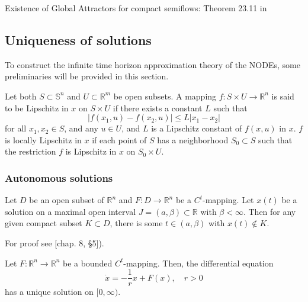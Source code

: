 \documentclass{article}
\newcounter{ct}
\begin{document}
 Existence of Global Attractors for compact semiflows: Theorem 23.11 in  \citep{sell2013dynamics}
 


\subsection{Uniqueness of solutions}\label{sec:solutions}
To construct the infinite time horizon approximation theory of the NODEs, some preliminaries will be provided in this section.


\begin{definition}[Lipschitz]
 Let both $S \subset \mathbb{S}^n$ and $U \subset \mathbb{R}^m$ be open subsets.
 A mapping $f: S \times U \rightarrow \mathbb{R}^n$ is said to be Lipschitz in $x$ on $S \times U$ if there exists a constant $L$ such that
\[
|f(x_1, u) - f(x_2, u)| \leq L |x_1 - x_2|
\]
for all $x_1, x_2 \in S$, and any $u \in U$, and $L$ is a Lipschitz constant of $f(x, u)$ in $x$. $f$ is locally Lipschitz in $x$ if each point of $S$ has a neighborhood $S_0 \subset S$ such that the restriction $f$ is Lipschitz in $x$ on $S_0 \times U$.
\end{definition}




\subsubsection{Autonomous solutions}\label{sec:autonomousunique}
\begin{lemma}
Let \( D \) be an open subset of \( \mathbb{R}^n \) and \( F : D \to \mathbb{R}^n \) be a \( C^t \)-mapping. 
Let \( x(t) \) be a solution on a maximal open interval \( J = (a, \beta) \subset \mathbb{R} \) with \( \beta < \infty \). 
Then for any given compact subset \( K \subset D \), there is some \( t \in (a, \beta) \) with \( x(t) \notin K \). 
\end{lemma}	
For proof see  \citep{hirsch1974nonautonomous}[chap. 8, §5]).


\begin{lemma}
Let \( F: \mathbb{R}^n \to \mathbb{R}^n \) be a bounded \( C^t \)-mapping. Then, the differential equation
\[
\dot{x} = -\frac{1}{r} x + F(x), \quad r > 0
\]
has a unique solution on \([0, \infty)\).
\end{lemma}	
\end{document}
